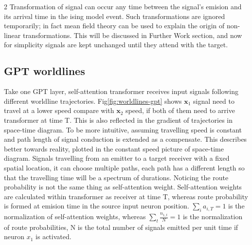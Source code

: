 \documentclass[11pt,a4paper]{article}
\begin{document}
\begin{multicols} {2}
Transformation of signal can occur any time between the signal's emision and its arrival time in the ising model event. Such transformations are ignored temporarily; in fact mean field theory 
can be used to explain the origin of non-linear transformations. This will be discussed in Further Work section, and now 
for simplicity signals are kept unchanged until they attend with the target.




  \subsection{GPT worldlines}
  Take one GPT layer, self-attention transformer receives input signals following different worldline trajectories. Fig\ref{fig:worldlines-gpt} shows $\boldsymbol{x}_1$ signal need to travel at a lower speed compare with $\boldsymbol{x}_2$ speed, if both of them need to arrive transformer at time T. 
  This is also reflected in the gradient of trajectories in space-time diagram. To be more intuitive, assuming travelling speed is constant and path length of signal conduction is extended as a compensate. This describes better towards reality, plotted in the constant speed picture of space-time diagram. 
  Signals travelling from an emitter to a target receiver with a fixed spatial location, it can choose multiple paths, each path has a different length so that the travelling time will be a spectrum of durations. 
  Noticing the route probability is not the same thing as self-attention weight. Self-attention weights are calculated within transformer as receiver at time T, whereas route probability is formed at emision time in the source input neuron position. 
  $\sum\limits_{i} a_{i,T}=1$ is the normalization of self-attention weights, whereas $\sum\limits_{t} \frac{n_{1,t}} {N} = 1$ is the normalization of route probabilities, N is the total number of signals emitted per unit time if neuron $x_1$ is activated. 



\end{multicols}
\end{document}

